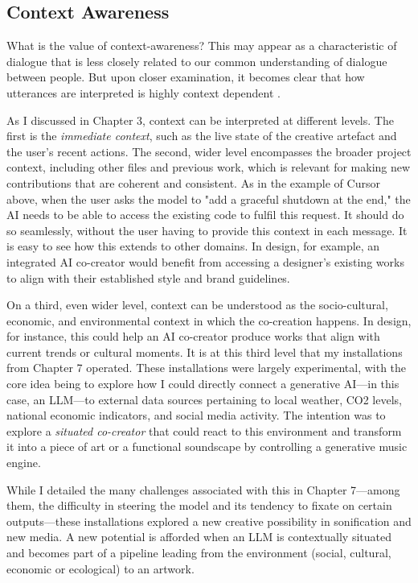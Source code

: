 \subsection{Context Awareness}
What is the value of context-awareness? This may appear as a characteristic of dialogue that is less closely related to our common understanding of dialogue between people. But upon closer examination, it becomes clear that how utterances are interpreted is highly context dependent \cite{Suchman1987-ab}.

As I discussed in Chapter 3, context can be interpreted at different levels. The first is the \textit{immediate context}, such as the live state of the creative artefact and the user's recent actions. The second, wider level encompasses the broader project context, including other files and previous work, which is relevant for making new contributions that are coherent and consistent. As in the example of Cursor above, when the user asks the model to "add a graceful shutdown at the end," the AI needs to be able to access the existing code to fulfil this request. It should do so seamlessly, without the user having to provide this context in each message. It is easy to see how this extends to other domains. In design, for example, an integrated AI co-creator would benefit from accessing a designer's existing works to align with their established style and brand guidelines.

On a third, even wider level, context can be understood as the socio-cultural, economic, and environmental context in which the co-creation happens. In design, for instance, this could help an AI co-creator produce works that align with current trends or cultural moments. It is at this third level that my installations from Chapter 7 operated. These installations were largely experimental, with the core idea being to explore how I could directly connect a generative AI—in this case, an LLM—to external data sources pertaining to local weather, CO2 levels, national economic indicators, and social media activity. The intention was to explore a \textit{situated co-creator} that could react to this environment and transform it into a piece of art or a functional soundscape by controlling a generative music engine.

While I detailed the many challenges associated with this in Chapter 7—among them, the difficulty in steering the model and its tendency to fixate on certain outputs—these installations explored a new creative possibility in sonification and new media. A new potential is afforded when an LLM is contextually situated and becomes part of a pipeline leading from the environment (social, cultural, economic or ecological) to an artwork.

